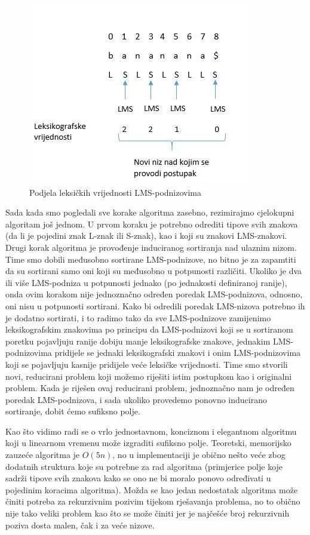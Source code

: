\begin{figure}[H]
   \centering
       \includegraphics{./pictures/leksvrij.jpg}
 \caption{Podjela leksičkih vrijednosti LMS-podnizovima}
 \label{fig:leks}
\end{figure}


Sada kada smo pogledali sve korake algoritma zasebno, rezimirajmo cjelokupni algoritam još jednom. U prvom koraku je potrebno odrediti tipove svih znakova (da li je pojedini znak L-znak ili S-znak), kao i koji su znakovi LMS-znakovi. Drugi korak algoritma je provođenje induciranog sortiranja nad ulaznim nizom. Time smo dobili međusobno sortirane LMS-podnizove, no bitno je za zapamtiti da su sortirani samo oni koji su međusobno u potpunosti različiti. Ukoliko je dva ili više LMS-podniza u potpunosti jednako (po jednakosti definiranoj ranije), onda ovim korakom nije jednoznačno određen poredak LMS-podnizova, odnosno, oni nisu u potpunosti sortirani. Kako bi odredili poredak LMS-nizova potrebno ih je dodatno sortirati, i to radimo tako da sve LMS-podnizove zamijenimo leksikografskim znakovima po principu da LMS-podnizovi koji se u sortiranom poretku pojavljuju ranije dobiju manje leksikografske znakove, jednakim LMS-podnizovima pridijele se jednaki leksikografski znakovi i onim LMS-podnizovima koji se pojavljuju kasnije pridijele veće leksičke vrijednosti. Time smo stvorili novi, reducirani problem koji možemo riješiti istim postupkom kao i originalni problem. Kada je riješen ovaj reducirani problem, jednoznačno nam je određen poredak LMS-podnizova, i sada ukoliko provedemo ponovno inducirano sortiranje, dobit ćemo sufiksno polje.


Kao što vidimo radi se o vrlo jednostavnom, konciznom i elegantnom algoritmu koji u linearnom vremenu može izgraditi sufiksno polje. Teoretski, memorijsko zauzeće algoritma je $O(5n)$, no u implementaciji je obično nešto veće zbog dodatnih struktura koje su potrebne za rad algoritma (primjerice polje koje sadrži tipove svih znakova kako se ono ne bi moralo ponovo određivati u pojedinim koracima algoritma). Možda se kao jedan nedostatak algoritma može činiti potreba za rekurzivnim pozivim tijekom rješavanja problema, no to obično nije tako veliki problem kao što se može činiti jer je najčešće broj rekurzivnih poziva dosta malen, čak i za veće nizove.



